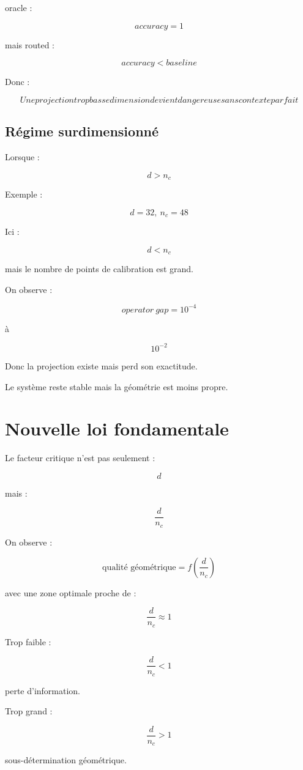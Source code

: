 \documentclass{article}
\begin{document}
oracle :

\[
accuracy=1
\]


mais routed :

\[
accuracy<baseline
\]


Donc :

\[
\boxed{
Une projection trop basse dimension devient dangereuse sans contexte parfait
}
\]


\subsection{Régime surdimensionné}

Lorsque :

\[
d>n_c
\]


Exemple :

\[
d=32,\ n_c=48
\]


Ici :

\[
d<n_c
\]

mais le nombre de points de calibration est grand.


On observe :

\[
operator\ gap=10^{-4}
\]

à

\[
10^{-2}
\]


Donc la projection existe mais perd son exactitude.


Le système reste stable mais la géométrie est moins propre.


\section{Nouvelle loi fondamentale}

Le facteur critique n'est pas seulement :

\[
d
\]


mais :

\[
\frac{d}{n_c}
\]


On observe :

\[
\boxed{
\text{qualité géométrique}
=
f(\frac{d}{n_c})
}
\]


avec une zone optimale proche de :

\[
\frac{d}{n_c}\approx1
\]


Trop faible :

\[
\frac{d}{n_c}<1
\]

perte d'information.


Trop grand :

\[
\frac{d}{n_c}>1
\]

sous-détermination géométrique.
\end{document}
